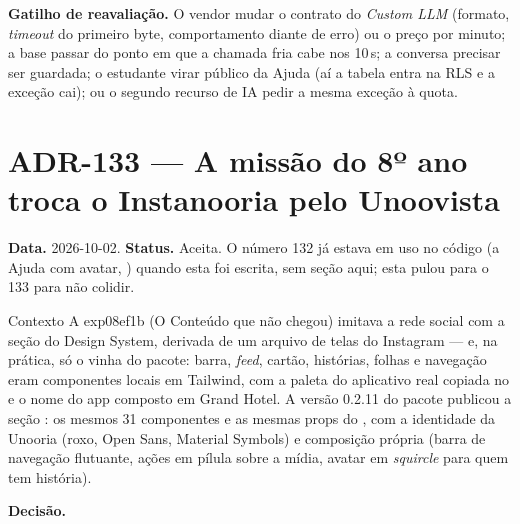 \textbf{Gatilho de reavaliação.} O vendor mudar o contrato do \emph{Custom LLM}
(formato, \emph{timeout} do primeiro byte, comportamento diante de erro) ou o
preço por minuto; a base passar do ponto em que a chamada fria cabe nos
10\,s; a conversa precisar ser guardada; o estudante virar público da
Ajuda (aí a tabela entra na RLS e a exceção cai); ou o segundo recurso de IA
pedir a mesma exceção à quota.

\section{ADR-133 --- A missão do 8º ano troca o Instanooria pelo Unoovista}
\label{adr:exp08ef1b-unoovista}

\textbf{Data.} 2026-10-02. \textbf{Status.} Aceita. O número 132 já estava em
uso no código (a Ajuda com avatar, ) quando esta foi escrita, sem
seção aqui; esta pulou para o 133 para não colidir.

\begin{especificacao}{Contexto}
A exp08ef1b (O Conteúdo que não chegou) imitava a rede social com a seção
 do Design System, derivada de um arquivo de telas do Instagram
--- e, na prática, só o  vinha do pacote: barra, \emph{feed}, cartão,
histórias, folhas e navegação eram componentes locais em Tailwind, com a
paleta do aplicativo real copiada no  e o nome do app
composto em Grand Hotel. A versão 0.2.11 do pacote publicou a seção
: os mesmos 31 componentes e as mesmas props do
, com a identidade da Unooria (roxo, Open Sans, Material
Symbols) e composição própria (barra de navegação flutuante, ações em pílula
sobre a mídia, avatar em \emph{squircle} para quem tem história).
\end{especificacao}

\textbf{Decisão.}

